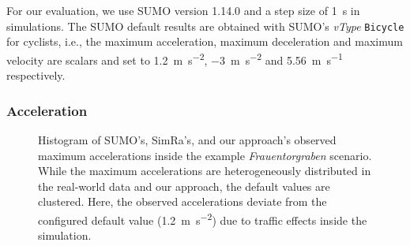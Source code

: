 For our evaluation, we use SUMO version 1.14.0 and a step size of \SI{1}{\s} in simulations.
The SUMO default results are obtained with SUMO's \textit{vType} \texttt{Bicycle} for cyclists, i.e., the maximum acceleration, maximum deceleration and maximum velocity are scalars and set to \SI{1.2}{\m\per\s\squared}, \SI{-3}{\m\per\s\squared} and \SI{5.56}{\m\per\s} respectively.

\subsubsection{Acceleration}
\label{subsubsec:acceleration_evaluation}
\begin{figure}[t]
    \vspace{-1.5em}
    \centering
    \hfill
    \caption{%
        Histogram of SUMO's, SimRa's, and our approach's observed maximum accelerations inside the example \textit{Frauentorgraben} scenario.
        While the maximum accelerations are heterogeneously distributed in the real-world data and our approach, the default values are clustered.
        Here, the observed accelerations deviate from the configured default value (\SI{1.2}{\metre\per\square\second}) due to traffic effects inside the simulation.
    }%
    \label{fig:eval_acc}
\end{figure}

